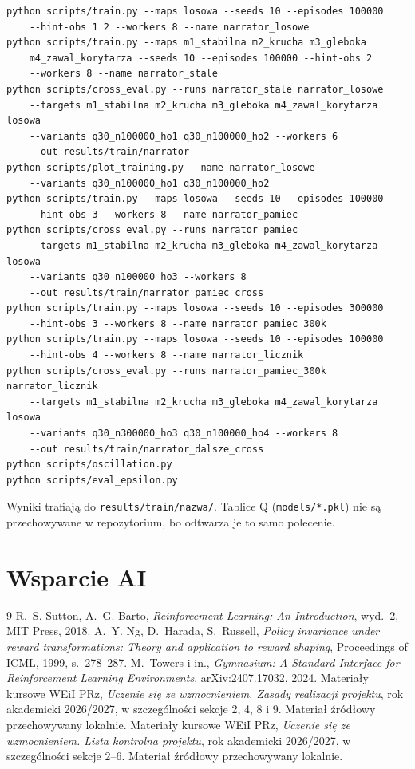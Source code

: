 \documentclass[11pt,a4paper]{article}
\begin{document}
\begin{verbatim}
python scripts/train.py --maps losowa --seeds 10 --episodes 100000
    --hint-obs 1 2 --workers 8 --name narrator_losowe
python scripts/train.py --maps m1_stabilna m2_krucha m3_gleboka
    m4_zawal_korytarza --seeds 10 --episodes 100000 --hint-obs 2
    --workers 8 --name narrator_stale
python scripts/cross_eval.py --runs narrator_stale narrator_losowe
    --targets m1_stabilna m2_krucha m3_gleboka m4_zawal_korytarza losowa
    --variants q30_n100000_ho1 q30_n100000_ho2 --workers 6
    --out results/train/narrator
python scripts/plot_training.py --name narrator_losowe
    --variants q30_n100000_ho1 q30_n100000_ho2
python scripts/train.py --maps losowa --seeds 10 --episodes 100000
    --hint-obs 3 --workers 8 --name narrator_pamiec
python scripts/cross_eval.py --runs narrator_pamiec
    --targets m1_stabilna m2_krucha m3_gleboka m4_zawal_korytarza losowa
    --variants q30_n100000_ho3 --workers 8
    --out results/train/narrator_pamiec_cross
python scripts/train.py --maps losowa --seeds 10 --episodes 300000
    --hint-obs 3 --workers 8 --name narrator_pamiec_300k
python scripts/train.py --maps losowa --seeds 10 --episodes 100000
    --hint-obs 4 --workers 8 --name narrator_licznik
python scripts/cross_eval.py --runs narrator_pamiec_300k narrator_licznik
    --targets m1_stabilna m2_krucha m3_gleboka m4_zawal_korytarza losowa
    --variants q30_n300000_ho3 q30_n100000_ho4 --workers 8
    --out results/train/narrator_dalsze_cross
python scripts/oscillation.py
python scripts/eval_epsilon.py
\end{verbatim}
Wyniki trafiają do \texttt{results/train/nazwa/}. Tablice Q
(\texttt{models/*.pkl}) nie są przechowywane w repozytorium, bo odtwarza je
to samo polecenie.

\section{Wsparcie AI}\label{sec:ai}


\begin{thebibliography}{9}
R.~S. Sutton, A.~G. Barto,
\emph{Reinforcement Learning: An Introduction}, wyd.~2, MIT Press, 2018.
A.~Y. Ng, D.~Harada, S.~Russell,
\emph{Policy invariance under reward transformations: Theory and application to
reward shaping}, Proceedings of ICML, 1999, s.~278--287.
M.~Towers i in., \emph{Gymnasium: A Standard Interface for Reinforcement Learning
Environments}, arXiv:2407.17032, 2024.
Materiały kursowe WEiI PRz,
\emph{Uczenie się ze wzmocnieniem. Zasady realizacji projektu},
rok akademicki 2026/2027, w szczególności sekcje 2, 4, 8 i 9.
Materiał źródłowy przechowywany lokalnie.
Materiały kursowe WEiI PRz,
\emph{Uczenie się ze wzmocnieniem. Lista kontrolna projektu},
rok akademicki 2026/2027, w szczególności sekcje 2--6.
Materiał źródłowy przechowywany lokalnie.
\end{thebibliography}
\end{document}
